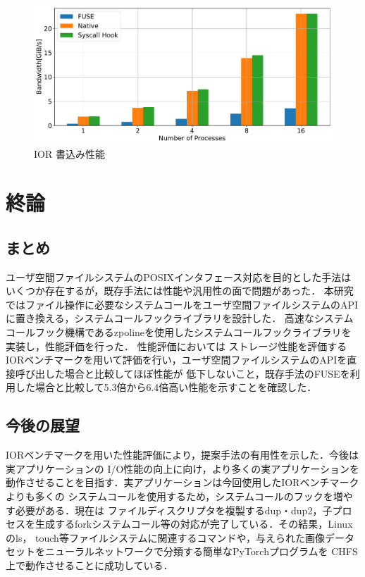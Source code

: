 \documentclass[a4paper,11pt]{jreport}
\begin{document}
\begin{figure}[h]
    \begin{minipage}[b]{1\columnwidth}
		\centering
		\includegraphics[width=0.9\linewidth]{./figure/ior_benchmark_write_v2.pdf}
		\caption{IOR 書込み性能}
		\label{fig:Evaluation write}
	\end{minipage}
\end{figure}

\chapter{終論}
\section{まとめ}
ユーザ空間ファイルシステムのPOSIXインタフェース対応を目的とした手法はいくつか存在するが，既存手法には性能や汎用性の面で問題があった．
本研究ではファイル操作に必要なシステムコールをユーザ空間ファイルシステムのAPIに置き換える，システムコールフックライブラリを設計した．
高速なシステムコールフック機構であるzpolineを使用したシステムコールフックライブラリを実装し，性能評価を行った．
性能評価においては
ストレージ性能を評価するIORベンチマークを用いて評価を行い，ユーザ空間ファイルシステムのAPIを直接呼び出した場合と比較してほぼ性能が
低下しないこと，既存手法のFUSEを利用した場合と比較して5.3倍から6.4倍高い性能を示すことを確認した．

\section{今後の展望}
IORベンチマークを用いた性能評価により，提案手法の有用性を示した．今後は実アプリケーションの
I/O性能の向上に向け，より多くの実アプリケーションを動作させることを目指す．実アプリケーションは今回使用したIORベンチマークよりも多くの
システムコールを使用するため，システムコールのフックを増やす必要がある．現在は
ファイルディスクリプタを複製するdup・dup2，子プロセスを生成するforkシステムコール等の対応が完了している．その結果，Linuxのls，
touch等ファイルシステムに関連するコマンドや，与えられた画像データセットをニューラルネットワークで分類する簡単なPyTorchプログラムを
CHFS上で動作させることに成功している．
\end{document}
